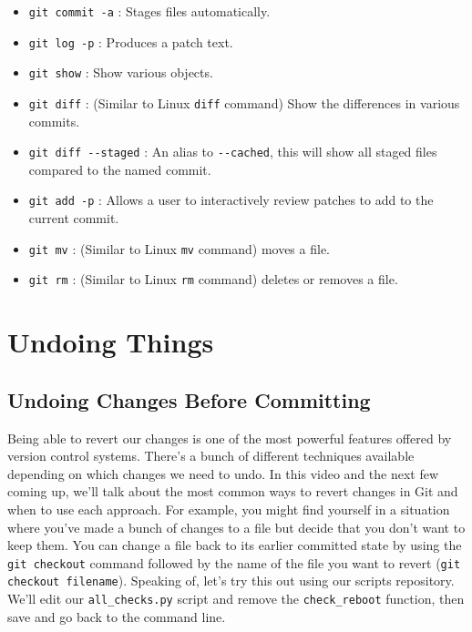 	\begin{itemize}
		\item \verb|git commit -a| : Stages files automatically.
		
		\item \verb|git log -p| : Produces a patch text.
		
		\item \verb|git show| : Show various objects.
		
 		\item \verb|git diff| : (Similar to Linux \texttt{diff} command) Show the differences in various commits.
 		
		\item \verb|git diff --staged| : An alias to \verb|--cached|, this will show all staged files compared to the named commit.
 		
 		\item \verb|git add -p| : Allows a user to interactively review patches to add to the current commit.
 		
 		\item \verb|git mv| : (Similar to Linux \texttt{mv} command) moves a file.
 		
 		\item \verb|git rm| : (Similar to Linux \texttt{rm} command) deletes or removes a file.
		 
		 
	\end{itemize}

\section{Undoing Things}

	\subsection{Undoing Changes Before Committing}
	
	Being able to revert our changes is one of the most powerful features offered by version control systems. There's a bunch of different techniques available depending on which changes we need to undo. In this video and the next few coming up, we'll talk about the most common ways to revert changes in Git and when to use each approach. For example, you might find yourself in a situation where you've made a bunch of changes to a file but decide that you don't want to keep them. You can change a file back to its earlier committed state by using the \texttt{git checkout} command followed by the name of the file you want to revert (\texttt{git checkout filename}). Speaking of, let's try this out using our scripts repository. We'll edit our \verb|all_checks.py| script and remove the \verb|check_reboot| function, then save and go back to the command line.
	
